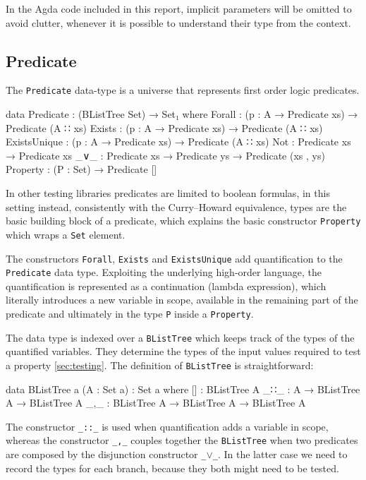 \documentclass[10pt,a4paper]{article}
\begin{document}
In the Agda code included in this report, implicit parameters will be omitted to avoid clutter, whenever it is possible to understand their type from the context.
	
	\subsection{Predicate}
\label{sec:predicate}
The \texttt{Predicate} data-type is a universe that represents first order logic predicates.

\begin{code}
data Predicate : (BListTree Set) → Set₁ where
  Forall : (p : A → Predicate xs) → Predicate (A ∷ xs)
  Exists : (p : A → Predicate xs) → Predicate (A ∷ xs)
  ExistsUnique : (p : A → Predicate xs) → Predicate (A ∷ xs)
  Not : Predicate xs → Predicate xs
  _∨_ : Predicate xs → Predicate ys → Predicate (xs , ys)
  Property : (P : Set) → Predicate []
\end{code}

In other testing libraries predicates are limited to boolean formulas, in this setting instead, consistently with the Curry–Howard equivalence, types are the basic building block of a predicate, which explains the basic constructor \texttt{Property} which wraps a \texttt{Set} element.

The constructors \texttt{Forall}, \texttt{Exists} and \texttt{ExistsUnique} add quantification to the \texttt{Predicate} data type.
Exploiting the underlying high-order language, the quantification is represented as a continuation (lambda expression), which literally introduces a new variable in scope, available in the remaining part of the predicate and ultimately in  the type \texttt{P} inside a \texttt{Property}.

The data type is indexed over a \texttt{BListTree} which keeps track of the types of the quantified variables. They determine the types of the input values
required to test a	 property \ref{sec:testing}.
The definition of \texttt{BListTree} is straightforward:
\begin{code}
data BListTree {a} (A : Set a) : Set a where 
  [] : BListTree A
  _∷_ : A → BListTree A → BListTree A
  _,_ : BListTree A → BListTree A → BListTree A
\end{code}
The constructor \texttt{\_::\_} is used when quantification adds a variable in scope, whereas the constructor \texttt{\_,\_} couples together the \texttt{BListTree} when two predicates are composed by the disjunction constructor \texttt{\_$\vee$\_}. In the latter case we need to record the types
for each branch, because they both might need to be tested.
\end{document}
